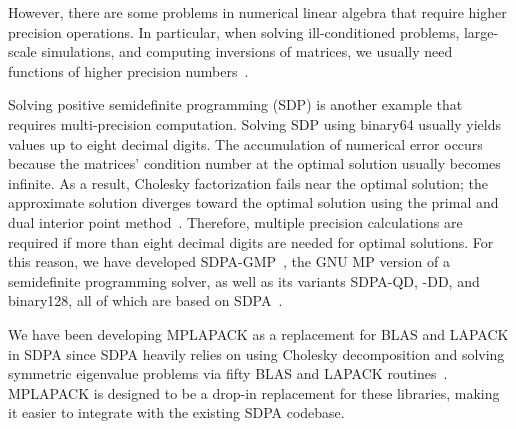 \documentclass[12pt]{article}
\begin{document}
However, there are some problems in numerical linear algebra that require higher precision operations. In particular, when solving ill-conditioned problems, large-scale simulations, and computing inversions of matrices, we usually need functions of higher precision numbers~\cite{BAILEY201210106,math3020337,high:ASNA2}.

Solving positive semidefinite programming (SDP) is another example that requires multi-precision computation. Solving SDP using binary64 usually yields values up to eight decimal digits. The accumulation of numerical error occurs because the matrices' condition number at the optimal solution usually becomes infinite. As a result, Cholesky factorization fails near the optimal solution; the approximate solution diverges toward the optimal solution using the primal and dual interior point method~\cite{SDP}. Therefore, multiple precision calculations are required if more than eight decimal digits are needed for optimal solutions. For this reason, we have developed SDPA-GMP~\cite{JCP2008,SDPA-GMP,SDPA}, the GNU MP version of a semidefinite programming solver, as well as its variants SDPA-QD, -DD, and binary128, all of which are based on SDPA~\cite{SDPA}.

We have been developing MPLAPACK as a replacement for BLAS and LAPACK in SDPA since SDPA heavily relies on using Cholesky decomposition and solving symmetric eigenvalue problems via fifty BLAS and LAPACK routines~\cite{sdpa-gmpgithub}. MPLAPACK is designed to be a drop-in replacement for these libraries, making it easier to integrate with the existing SDPA codebase.
\end{document}
